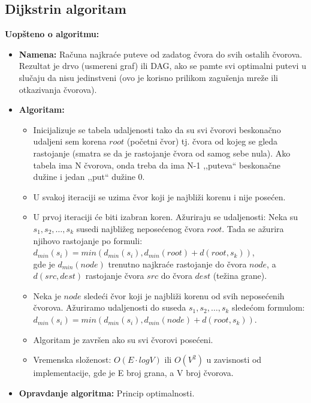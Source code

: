 \documentclass[a4paper]{article}
\begin{document}
    \subsection{Dijkstrin algoritam}
        \noindent \textbf{Uopšteno o algoritmu:}
        \begin{itemize}
            \item \textbf{Namena:} Računa najkraće puteve od zadatog čvora do svih ostalih
                  čvorova. Rezultat je drvo (usmereni graf) ili DAG, ako se pamte
                  svi optimalni putevi u slučaju da nisu jedinstveni (ovo je korisno
                  prilikom zagušenja mreže ili otkazivanja čvorova).
            \item \textbf{Algoritam:} 
                  \begin{itemize}
                      \item Inicijalizuje se tabela udaljenosti tako da su svi čvorovi 
                            beskonačno udaljeni sem korena $root$ (početni čvor) tj. čvora od kojeg 
                            se gleda rastojanje (smatra se da je rastojanje čvora od samog sebe nula).
                            Ako tabela ima N čvorova, onda treba da ima N-1 ,,puteva``
                            beskonačne dužine i jedan ,,put`` dužine 0.
                      \item U svakoj iteraciji se uzima čvor koji je najbliži korenu i nije posećen.
                      \item U prvoj iteraciji će biti izabran koren.
                            Ažuriraju se udaljenosti: Neka su $s_1, s_2, \dots, s_k$ susedi
                            najbližeg neposećenog čvora $root$. Tada se ažurira njihovo rastojanje
                            po formuli: \\
                            $d_{min}(s_i) = min(d_{min}(s_i), d_{min}(root) + d(root, s_k))$, \\
                            gde je $d_{min}(node)$ trenutno najkraće rastojanje do čvora $node$, a 
                            $d(src, dest)$ rastojanje čvora $src$ do čvora $dest$ (težina grane). 
                      \item Neka je $node$ sledeći čvor koji je najbliži korenu od svih neposećenih čvorova.
                            Ažuriramo udaljenosti do suseda $s_1, s_2, \dots, s_k$ sledećom formulom: \\
                            $d_{min}(s_i) = min(d_{min}(s_i), d_{min}(node) + d(root, s_k))$.
                      \item Algoritam je završen ako su svi čvorovi posećeni.
                      \item Vremenska složenost: $O(E\cdot log{V})$ ili $O(V^{2})$ u zavisnosti
                            od implementacije, gde je E broj grana, a V broj čvorova.
                  \end{itemize} 
            \item \textbf{Opravdanje algoritma:} Princip optimalnosti.
        \end{itemize}
\end{document}
